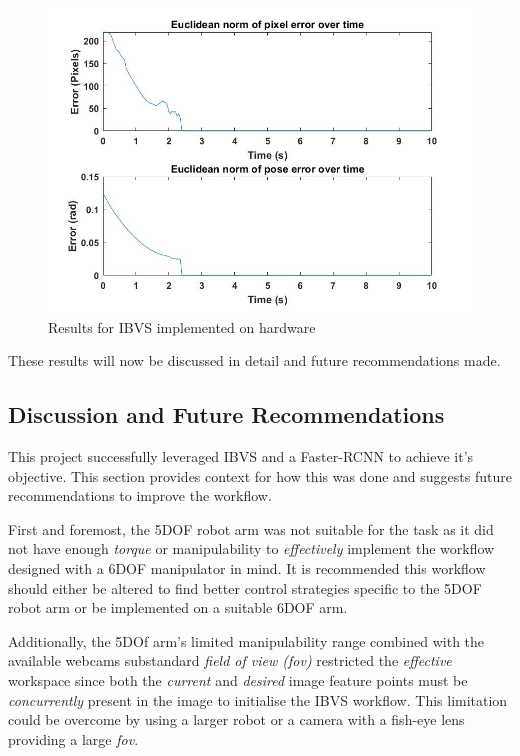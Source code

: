 \documentclass{UoNMCHA}
\numberwithin{equation}{section}
\begin{document}
\begin{figure}[H]
	\begin{center}
		\includegraphics[width=.99\linewidth]{Figures/IBVSerrorproof}
		\caption{Results for IBVS implemented on hardware}
		\label{fig:IBVSerrorproof}
	\end{center}
\end{figure}

These results will now be discussed in detail and future recommendations made.

\subsection{Discussion and Future Recommendations}


This project successfully leveraged IBVS and a Faster-RCNN to achieve it's objective. This section provides context for how this was done and suggests future recommendations to improve the workflow.\

First and foremost, the 5DOF robot arm was not suitable for the task as it did not have enough \textit{torque} or manipulability to \textit{effectively} implement the workflow designed with a 6DOF manipulator in mind. It is recommended this workflow should either be altered to find better control strategies specific to the 5DOF robot arm or be implemented on a suitable 6DOF arm.\

Additionally, the 5DOf arm's limited manipulability range combined with the available webcams substandard \textit{field of view (fov)} restricted the \textit{effective} workspace since both the \textit{current} and \textit{desired} image feature points must be \textit{concurrently} present in the image to initialise the IBVS workflow. This limitation could be overcome by using a larger robot or a camera with a fish-eye lens providing a large \textit{fov}.  
\end{document}
